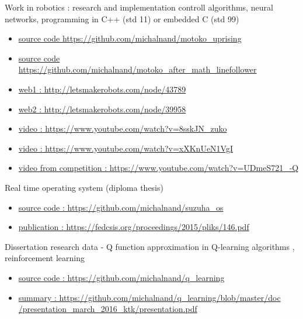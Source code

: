 \documentclass[10pt]{article}
\begin{document}
Work in robotics  : research and implementation controll algorithms, neural networks,
programming in C++ (std 11) or embedded C (std 99)
\begin{itemize}
\item \href{https://github.com/michalnand/motoko\_uprising}{source code https://github.com/michalnand/motoko\_uprising}
\item \href{https://github.com/michalnand/motoko\_after\_math\_linefollower}{source code https://github.com/michalnand/motoko\_after\_math\_linefollower}
\item \href{http://letsmakerobots.com/node/43789}{web1 : http://letsmakerobots.com/node/43789}
\item \href{http://letsmakerobots.com/node/39958}{web2 : http://letsmakerobots.com/node/39958}
\item \href{https://www.youtube.com/watch?v=8sskJN\_zuko}{video : https://www.youtube.com/watch?v=8sskJN\_zuko}
\item \href{https://www.youtube.com/watch?v=xXKnUeN1VgI}{video : https://www.youtube.com/watch?v=xXKnUeN1VgI}
\item \href{https://www.youtube.com/watch?v=UDmeS721\_-Q}{video from competition : https://www.youtube.com/watch?v=UDmeS721\_-Q}
\end{itemize}

Real time operating system (diploma thesis)
 
\begin{itemize}
\item \href{https://github.com/michalnand/suzuha\_os}{source code : https://github.com/michalnand/suzuha\_os}
\item \href{https://fedcsis.org/proceedings/2015/pliks/146.pdf}{publication : https://fedcsis.org/proceedings/2015/pliks/146.pdf}
\end{itemize}

Dissertation research data - Q function approximation in Q-learning algorithms
, reinforcement learning
\begin{itemize}
\item \href{https://github.com/michalnand/q\_learning}{source code : https://github.com/michalnand/q\_learning}
\item \href{https://github.com/michalnand/q\_learning/blob/master/doc/presentation\_march\_2016\_ktk/presentation.pdf}{summary : https://github.com/michalnand/q\_learning/blob/master/doc\\
                  /presentation\_march\_2016\_ktk/presentation.pdf}
\end{itemize}
\end{document}
